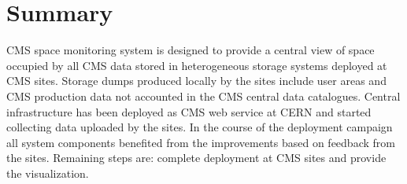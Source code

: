 \section {Summary}

CMS space monitoring system is designed to provide a central view of space occupied by 
all CMS data stored in heterogeneous storage systems deployed at CMS sites. 
Storage dumps produced locally by the sites include user areas and CMS production 
data not accounted in the CMS central data catalogues. Central infrastructure has 
been deployed as CMS web service at CERN and started collecting data uploaded by 
the sites. In the course of the deployment campaign all system components 
benefited from the improvements based on feedback from the sites. Remaining steps 
are: complete deployment at CMS sites and provide the visualization.
